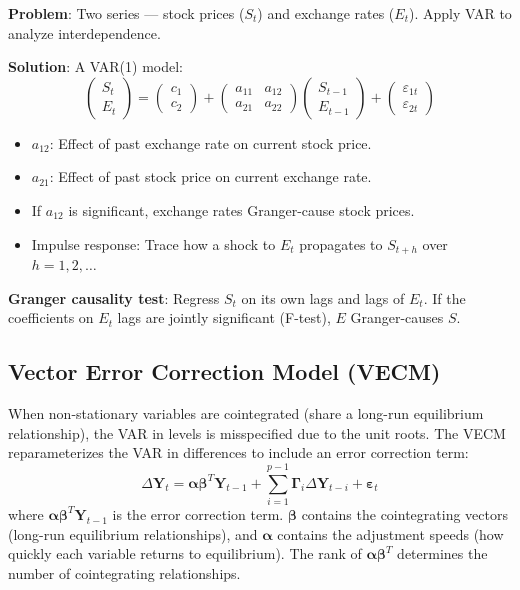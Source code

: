 \documentclass[11pt,a4paper]{article}
\begin{document}
\begin{tcolorbox}[colback=blue!5!white,colframe=blue!75!black,title=\textbf{Worked Example 16: VAR for Stock Prices and Exchange Rates}]
\textbf{Problem}: Two series --- stock prices ($S_t$) and exchange rates ($E_t$). Apply VAR to analyze interdependence.

\textbf{Solution}: A VAR(1) model:
\[
\begin{pmatrix} S_t \\ E_t \end{pmatrix} = \begin{pmatrix} c_1 \\ c_2 \end{pmatrix} + \begin{pmatrix} a_{11} & a_{12} \\ a_{21} & a_{22} \end{pmatrix} \begin{pmatrix} S_{t-1} \\ E_{t-1} \end{pmatrix} + \begin{pmatrix} \varepsilon_{1t} \\ \varepsilon_{2t} \end{pmatrix}
\]
\begin{itemize}
    \item $a_{12}$: Effect of past exchange rate on current stock price.
    \item $a_{21}$: Effect of past stock price on current exchange rate.
    \item If $a_{12}$ is significant, exchange rates Granger-cause stock prices.
    \item Impulse response: Trace how a shock to $E_t$ propagates to $S_{t+h}$ over $h=1,2,\ldots$
\end{itemize}
\textbf{Granger causality test}: Regress $S_t$ on its own lags and lags of $E_t$. If the coefficients on $E_t$ lags are jointly significant (F-test), $E$ Granger-causes $S$.
\end{tcolorbox}

\subsection{Vector Error Correction Model (VECM)}

When non-stationary variables are cointegrated (share a long-run equilibrium relationship), the VAR in levels is misspecified due to the unit roots. The VECM reparameterizes the VAR in differences to include an error correction term:
\[
\Delta \mathbf{Y}_t = \mathbf{\alpha} \mathbf{\beta}^T \mathbf{Y}_{t-1} + \sum_{i=1}^{p-1} \mathbf{\Gamma}_i \Delta \mathbf{Y}_{t-i} + \boldsymbol{\varepsilon}_t
\]
where $\mathbf{\alpha} \mathbf{\beta}^T \mathbf{Y}_{t-1}$ is the error correction term. $\mathbf{\beta}$ contains the cointegrating vectors (long-run equilibrium relationships), and $\mathbf{\alpha}$ contains the adjustment speeds (how quickly each variable returns to equilibrium). The rank of $\mathbf{\alpha} \mathbf{\beta}^T$ determines the number of cointegrating relationships.
\end{document}
